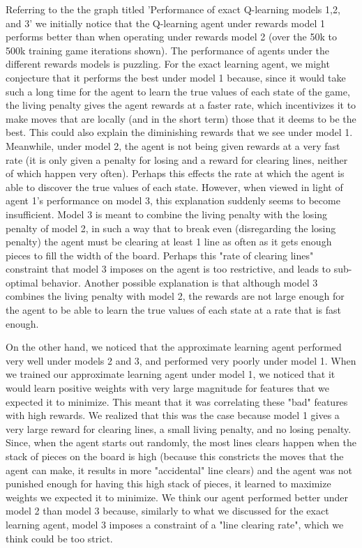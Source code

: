 \documentclass[10pt]{article}
\begin{document}
\bigskip

Referring to the the graph titled 'Performance of exact Q-learning models 1,2, and 3' we initially notice that the Q-learning agent under rewards model 1 performs better than when operating under rewards model 2 (over the 50k to 500k training game iterations shown). The performance of agents under the different rewards models is puzzling. For the exact learning agent, we might conjecture that it performs the best under model 1 because, since it would take such a long time for the agent to learn the true values of each state of the game, the living penalty gives the agent rewards at a faster rate, which incentivizes it to make moves that are locally (and in the short term) those that it deems to be the best. This could also explain the diminishing rewards that we see under model 1. Meanwhile, under model 2, the agent is not being given rewards at a very fast rate (it is only given a penalty for losing and a reward for clearing lines, neither of which happen very often). Perhaps this effects the rate at which the agent is able to discover the true values of each state. However, when viewed in light of agent 1's performance on model 3, this explanation suddenly seems to become insufficient. Model 3 is meant to combine the living penalty with the losing penalty of model 2, in such a way that to break even (disregarding the losing penalty) the agent must be clearing at least 1 line as often as it gets enough pieces to fill the width of the board. Perhaps this "rate of clearing lines" constraint that model 3 imposes on the agent is too restrictive, and leads to sub-optimal behavior. Another possible explanation is that although model 3 combines the living penalty with model 2, the rewards are not large enough for the agent to be able to learn the true values of each state at a rate that is fast enough.

\bigskip

On the other hand, we noticed that the approximate learning agent performed very well under models 2 and 3, and performed very poorly under model 1. When we trained our approximate learning agent under model 1, we noticed that it would learn positive weights with very large magnitude for features that we expected it to minimize. This meant that it was correlating these "bad" features with high rewards. We realized that this was the case because model 1 gives a very large reward for clearing lines, a small living penalty, and no losing penalty. Since, when the agent starts out randomly, the most lines clears happen when the stack of pieces on the board is high (because this constricts the moves that the agent can make, it results in more "accidental" line clears) and the agent was not punished enough for having this high stack of pieces, it learned to maximize weights we expected it to minimize. We think our agent performed better under model 2 than model 3 because, similarly to what we discussed for the exact learning agent, model 3 imposes a constraint of a "line clearing rate", which we think could be too strict.
\end{document}
